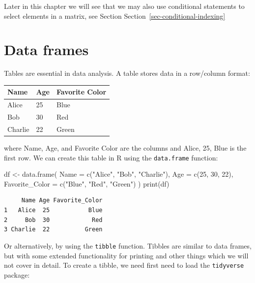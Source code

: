 \documentclass[
  letterpaper,
  DIV=11,
  numbers=noendperiod]{scrreprt}
\newenvironment{Shaded}{\begin{snugshade}}{\end{snugshade}}
\newcommand{\AttributeTok}[1]{\textcolor[rgb]{0.40,0.45,0.13}{#1}}
\newcommand{\DecValTok}[1]{\textcolor[rgb]{0.68,0.00,0.00}{#1}}
\newcommand{\FunctionTok}[1]{\textcolor[rgb]{0.28,0.35,0.67}{#1}}
\newcommand{\NormalTok}[1]{\textcolor[rgb]{0.00,0.23,0.31}{#1}}
\newcommand{\OtherTok}[1]{\textcolor[rgb]{0.00,0.23,0.31}{#1}}
\newcommand{\StringTok}[1]{\textcolor[rgb]{0.13,0.47,0.30}{#1}}
\begin{document}
Later in this chapter we will see that we may also use conditional
statements to select elements in a matrix, see Section
Section~\ref{sec-conditional-indexing}

\section{Data frames}\label{data-frames}

Tables are essential in data analysis. A table stores data in a
row/column format:

\begin{longtable}[]{@{}lll@{}}
\toprule\noalign{}
Name & Age & Favorite Color \\
\midrule\noalign{}
\endhead
\bottomrule\noalign{}
\endlastfoot
Alice & 25 & Blue \\
Bob & 30 & Red \\
Charlie & 22 & Green \\
\end{longtable}

where Name, Age, and Favorite Color are the columns and Alice, 25, Blue
is the first row. We can create this table in R using the
\texttt{data.frame} function:

\begin{Shaded}
\begin{Highlighting}[]
\NormalTok{df }\OtherTok{\textless{}{-}} \FunctionTok{data.frame}\NormalTok{(}
  \AttributeTok{Name =} \FunctionTok{c}\NormalTok{(}\StringTok{"Alice"}\NormalTok{, }\StringTok{"Bob"}\NormalTok{, }\StringTok{"Charlie"}\NormalTok{),}
  \AttributeTok{Age =} \FunctionTok{c}\NormalTok{(}\DecValTok{25}\NormalTok{, }\DecValTok{30}\NormalTok{, }\DecValTok{22}\NormalTok{),}
  \AttributeTok{Favorite\_Color =} \FunctionTok{c}\NormalTok{(}\StringTok{"Blue"}\NormalTok{, }\StringTok{"Red"}\NormalTok{, }\StringTok{"Green"}\NormalTok{)}
\NormalTok{)}
\FunctionTok{print}\NormalTok{(df)}
\end{Highlighting}
\end{Shaded}

\begin{verbatim}
     Name Age Favorite_Color
1   Alice  25           Blue
2     Bob  30            Red
3 Charlie  22          Green
\end{verbatim}

Or alternatively, by using the \texttt{tibble} function. Tibbles are
similar to data frames, but with some extended functionality for
printing and other things which we will not cover in detail. To create a
tibble, we need first need to load the \texttt{tidyverse} package:
\end{document}
